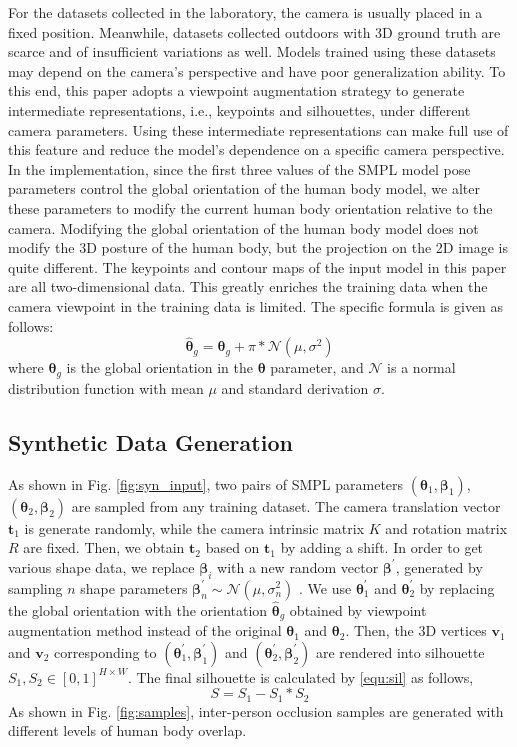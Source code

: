\documentclass[journal]{IEEEtran}
\begin{document}
For the datasets collected in the laboratory, the camera is usually placed in a fixed position. Meanwhile, datasets collected outdoors with 3D ground truth are scarce and of insufficient variations as well. Models trained using these datasets may depend on the camera's perspective and have poor generalization ability. To this end, this paper adopts a viewpoint augmentation strategy to generate intermediate representations, i.e., keypoints and silhouettes, under different camera parameters. Using these intermediate representations can make full use of this feature and reduce the model's dependence on a specific camera perspective. In the implementation, since the first three values of the SMPL model pose parameters control the global orientation of the human body model, we alter these parameters to modify the current human body orientation relative to the camera. Modifying the global orientation of the human body model does not modify the 3D posture of the human body, but the projection on the 2D image is quite different. The keypoints and contour maps of the input model in this paper are all two-dimensional data. This greatly enriches the training data when the camera viewpoint in the training data is limited. The specific formula is given as follows:
\begin{equation}
    \hat{\bm{\theta}}_{g} = \bm{\theta}_{g} + \pi*\mathcal{N}(\mu, \sigma^{2}) 
\end{equation}
where $\bm{\theta}_{g}$ is the global orientation in the $\bm{\theta}$ parameter, and $\mathcal{N}$ is  a normal distribution function with mean $\mu$ and standard derivation $\sigma$.

\subsection{Synthetic Data Generation}
As shown in Fig. \ref{fig:syn_input}, two pairs of SMPL parameters $(\bm{\theta}_1, \bm{\beta}_1)$,$(\bm{\theta}_2, \bm{\beta}_2)$ are sampled from any training dataset. The camera translation vector $\bm{t}_1$ is generate randomly, while the camera intrinsic matrix $K$ and rotation matrix $R$ are fixed. Then, we obtain $\bm{t}_2$ based on $\bm{t}_1$ by adding a shift. In order to get various shape data, we replace $\bm{\beta}_{i}$ with a new random vector $\bm{\beta}^{'}$, generated by sampling $n$ shape parameters $\bm{\beta}_{n}^{'} \sim \mathcal{N}(\mu,\sigma_{n}^{2})$ \cite{STRAPS2020BMVC}. We use $\bm{\theta}_{1}^{'}$ and $\bm{\theta}_{2}^{'}$ by replacing the global orientation with the orientation $\hat{\bm{\theta}}_{g}$ obtained by viewpoint augmentation method instead of the original $\bm{\theta}_{1}$ and $\bm{\theta}_{2}$. Then, the 3D vertices $\bm{v}_1$ and $\bm{v}_2$ corresponding to $(\bm{\theta}_{1}^{'}, \bm{\beta}_1^{'})$ and $(\bm{\theta}_{2}^{'}, \bm{\beta}_2^{'})$ are rendered \cite{kato2018neural} into silhouette $S_{1},S_{2} \in [0, 1]^{H \times W}$. The final silhouette is calculated by {\eqref{equ:sil}} as follows,
\begin{equation}
    S = S_{1}-S_{1}*S_{2}
    \label{equ:sil}
\end{equation}
As shown in Fig. \ref{fig:samples}, inter-person occlusion samples are generated with different levels of human body overlap.
\end{document}
